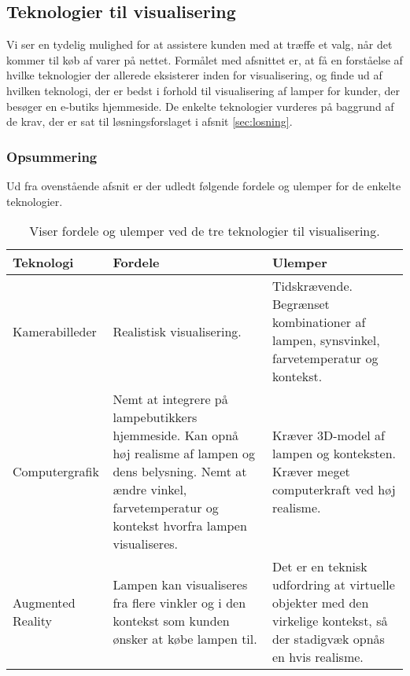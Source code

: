 \subsection{Teknologier til visualisering}
\label{sec:tek_til_visualisering}
Vi ser en tydelig mulighed for at assistere kunden med at træffe et valg, når det kommer til køb af varer på nettet. Formålet med afsnittet er, at få en forståelse af hvilke teknologier der allerede eksisterer inden for visualisering, og finde ud af hvilken teknologi, der er bedst i forhold til visualisering af lamper for kunder, der besøger en e-butiks hjemmeside. De enkelte teknologier vurderes på baggrund af de krav, der er sat til løsningsforslaget i afsnit \ref{sec:losning}.







\subsubsection*{Opsummering}
Ud fra ovenstående afsnit er der udledt følgende fordele og ulemper for de enkelte teknologier.
\begin{table}[H]
  \centering
  
\center
    \begin{tabular}{ | p{3cm} | p{5cm} | p{5cm} |}
    
    \hline
    Teknologi & Fordele & Ulemper \\ \hline
    Kamerabilleder & Realistisk visualisering. & Tidskrævende. Begrænset kombinationer af lampen, synsvinkel, farvetemperatur og kontekst. \\ \hline
   Computergrafik & Nemt at integrere på lampebutikkers hjemmeside. Kan opnå høj realisme af lampen og dens belysning. \newline Nemt at ændre vinkel, farvetemperatur og kontekst hvorfra lampen visualiseres. & Kræver 3D-model af lampen og konteksten. Kræver meget computerkraft ved høj realisme. \\ \hline
   Augmented Reality & Lampen kan visualiseres fra flere vinkler og i den kontekst som kunden ønsker at købe lampen til. & Det er en teknisk udfordring at virtuelle objekter med den virkelige kontekst, så der stadigvæk opnås en hvis realisme. \\ \hline
    \end{tabular}
  \caption{Viser fordele og ulemper ved de tre teknologier til visualisering.}
\label{tab:fordele_ulemper_teknologier}
\end{table}

